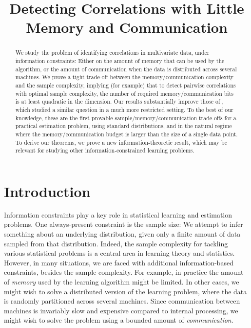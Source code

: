 \documentclass[final, 12pt]{colt2018}
\title{Detecting Correlations with Little Memory and Communication}
\newcommand{\note}[1]{\textcolor{red}{\textbf{#1}}}
\begin{document}
\maketitle

\begin{abstract}
We study the problem of identifying correlations in multivariate data, under information constraints: Either on the amount of memory that can be used by the algorithm, or the amount of communication when the data is distributed across several machines. We prove a tight trade-off between the memory/communication complexity and the sample complexity, implying (for example) that to detect pairwise correlations with optimal sample complexity, the number of required memory/communication bits is at least quadratic in the dimension. Our results substantially improve those of \cite{shamir2014fundamental}, which studied a similar question in a much more restricted setting. To the best of our knowledge, these are the first provable sample/memory/communication trade-offs for a practical estimation problem, using standard distributions, and in the natural regime where the memory/communication budget is larger than the size of a single data point. To derive our theorems, we prove a new information-theoretic result, which may be relevant for studying other information-constrained learning problems.
\end{abstract}
\section{Introduction}

Information constraints play a key role in statistical learning and 
estimation problems. One always-present constraint is the sample size: 
We attempt to infer something about an underlying 
distribution, given only a finite amount of data sampled from that 
distribution. Indeed, the sample complexity for 
tackling various statistical problems is a central area in learning 
theory and statistics. However, in many situations, we are faced with 
additional information-based constraints, besides the sample complexity. For 
example, in practice the amount of \emph{memory} used by the learning algorithm 
might be limited. In other cases, we might wish to solve a distributed version 
of the learning problem, where the data is randomly partitioned across several machines. Since communication between machines is invariably slow and expensive 
compared to internal processing, we might wish to solve the problem using a 
bounded amount of \emph{communication}. 
\end{document}
